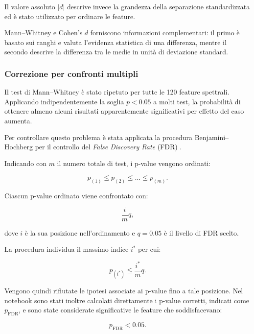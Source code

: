 Il valore assoluto $|d|$ descrive invece la grandezza della
separazione standardizzata ed è stato utilizzato per ordinare le
feature.

Mann--Whitney e Cohen's $d$ forniscono informazioni complementari:
il primo è basato sui ranghi e valuta l'evidenza statistica di una
differenza, mentre il secondo descrive la differenza tra le medie in
unità di deviazione standard. 


\subsubsection{Correzione per confronti multipli}

Il test di Mann--Whitney è stato ripetuto per tutte le 120 feature
spettrali. Applicando indipendentemente la soglia $p<0.05$ a molti
test, la probabilità di ottenere almeno alcuni risultati
apparentemente significativi per effetto del caso aumenta.

Per controllare questo problema è stata applicata la procedura
Benjamini--Hochberg per il controllo del
\textit{False Discovery Rate} (FDR) \cite{multiple}.

Indicando con $m$ il numero totale di test, i p-value vengono ordinati:

\begin{equation}
	p_{(1)}
	\leq
	p_{(2)}
	\leq
	\ldots
	\leq
	p_{(m)}.
\end{equation}

Ciascun p-value ordinato viene confrontato con:

\begin{equation}
	\frac{i}{m}q,
\end{equation}

dove $i$ è la sua posizione nell'ordinamento e $q=0.05$ è il livello
di FDR scelto.

La procedura individua il massimo indice $i^\ast$ per cui:

\begin{equation}
	p_{(i^\ast)}
	\leq
	\frac{i^\ast}{m}q.
\end{equation}

Vengono quindi rifiutate le ipotesi associate ai p-value fino a tale
posizione. Nel notebook sono stati inoltre calcolati direttamente i
p-value corretti, indicati come $p_{\mathrm{FDR}}$, e sono state
considerate significative le feature che soddisfacevano:

\begin{equation}
	p_{\mathrm{FDR}}<0.05.
\end{equation}

